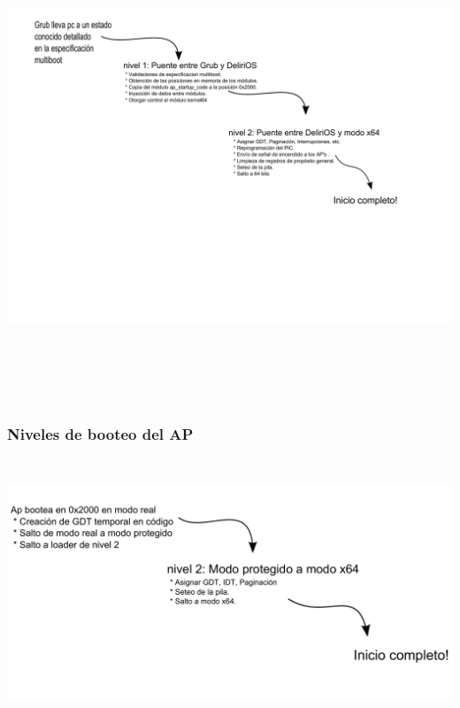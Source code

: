 	\begin{center}
		\includegraphics[height=14cm]{images/bsp-stages-diagram.pdf} 
	\end{center}
	
	\subsubsection{Niveles de booteo del AP}

	\begin{center}
		\includegraphics[height=8cm]{images/ap-stages-diagram.pdf} 
	\end{center}

